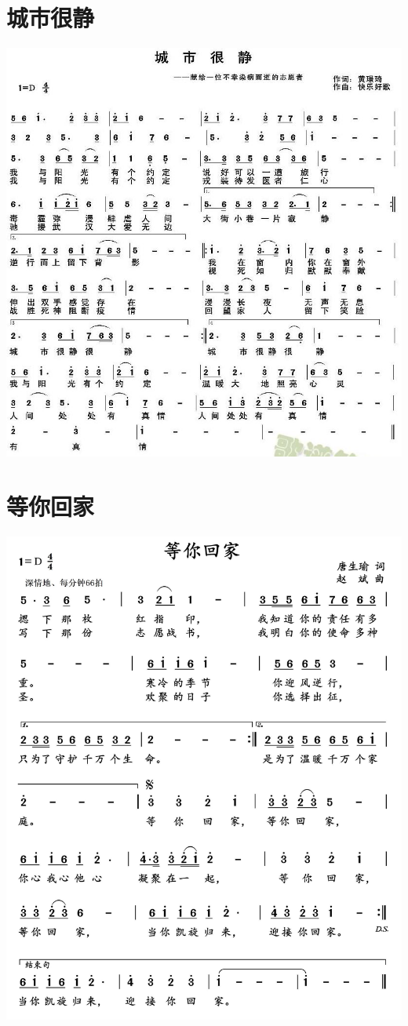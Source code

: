 \documentclass[cn,pad,chinese,chinesefont=nofont]{elegantbook}
\begin{document}
\section{城市很静}
    \includegraphics[width=\textwidth]{dongxiao/20200402-城市很静} 
\section{等你回家}
    \includegraphics[width=\textwidth]{dongxiao/20200402-等你回家}
\end{document}

